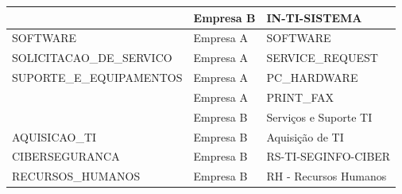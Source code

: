 \documentclass[
    12pt,                %
    openright,           %
    oneside,             %
    a4paper,             %
    english,             %
    brazil               %
]{abntex2}
\begin{document}
\begin{apendicesenv}
{\begin{longtable}{p{5.5cm}p{1.7cm}p{7.5cm}}
     & Empresa B & IN-TI-SISTEMA \\
    \midrule
    SOFTWARE & Empresa A & SOFTWARE \\
    \midrule
    SOLICITACAO\_DE\_SERVICO & Empresa A & SERVICE\_REQUEST \\
    \midrule
    SUPORTE\_E\_EQUIPAMENTOS & Empresa A & PC\_HARDWARE \\
     & Empresa A & PRINT\_FAX \\
     & Empresa B & Serviços e Suporte TI \\
    \midrule
    AQUISICAO\_TI & Empresa B & Aquisição de TI \\
    \midrule
    CIBERSEGURANCA & Empresa B & RS-TI-SEGINFO-CIBER \\
    \midrule
    RECURSOS\_HUMANOS & Empresa B & RH - Recursos Humanos \\
\end{longtable}
}

\end{apendicesenv}
\end{document}
